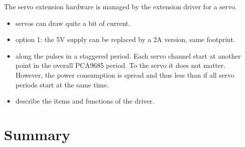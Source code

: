 The servo extension hardware is managed by the extension driver for a servo.

\begin{itemize}
\item servos can draw quite a bit of current.
\item option 1: the 5V supply can be replaced by a 2A version, same footprint.
\item along the pulses in a staggered period. Each servo channel start at another point in the overall PCA9685 period. To the servo it does not matter. However, the power consumption is spread and thus less than if all servo periods start at the same time.
\item describe the items and functions of the driver.
\end{itemize}

\section{Summary}

